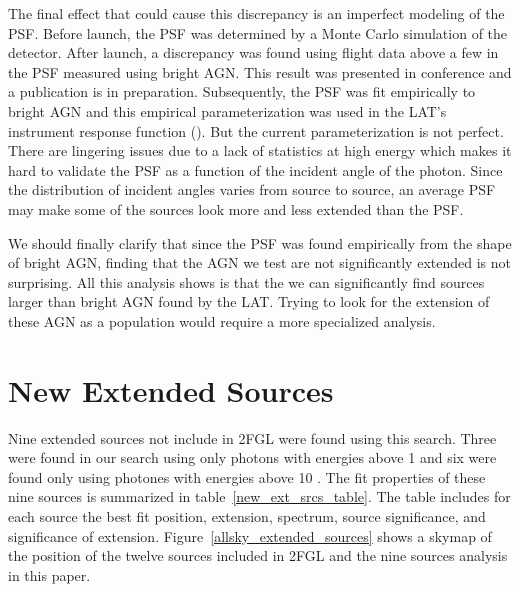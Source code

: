\documentclass[12pt,preprint]{aastex}
\newcommand{\gev}{\text{GeV}\xspace}
\begin{document}
The final effect that could cause this discrepancy is an imperfect
modeling of the PSF.  Before launch, the PSF
was determined by a Monte Carlo simulation of the detector.
After launch, a discrepancy was found using flight data above a
few \gev in the PSF measured using bright AGN.  This result
was presented in conference and a publication is in preparation.
Subsequently, the PSF was fit empirically to bright AGN and this
empirical parameterization was used in the LAT's instrument
response function (\cite{lat_on_orbit_psf}).
But the current parameterization is not perfect. There are lingering
issues due to a lack of statistics at high energy which makes it hard to
validate the PSF as a function of the incident angle of the photon. Since
the distribution of incident angles varies from source to source, an
average PSF may make some of the sources look more and less extended
than the PSF.

We should finally clarify that since the PSF was found empirically
from the shape of bright AGN, finding that the AGN we test are not
significantly extended is not surprising.  All this analysis shows
is that the we can significantly find sources larger than bright AGN
found by the LAT.  Trying to look for the extension of these AGN as a
population would require a more specialized analysis.

\section{New Extended Sources}
\label{new_ext_srcs_section}



Nine extended sources not include in 2FGL were found
using this search.  Three were found in our search using only photons
with energies above 1 \gev and six were found only using photones with
energies above 10 \gev.  The fit properties of these nine sources is
summarized in table~\ref{new_ext_srcs_table}.  The table includes for each
source the best fit position, extension, spectrum, source significance,
and significance of extension.  Figure~\ref{allsky_extended_sources}
shows a skymap of the position of the twelve sources included in 2FGL
and the nine sources analysis in this paper.
\end{document}
